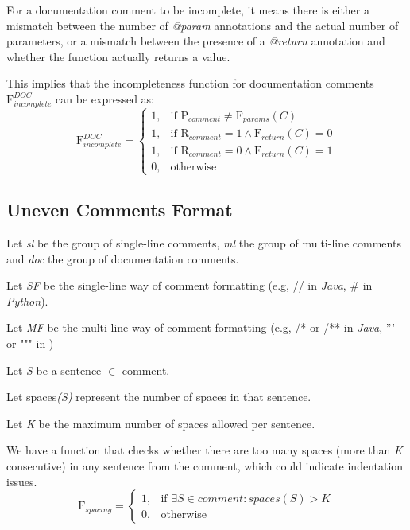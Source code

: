 \noindent For a documentation comment to be incomplete, it means there is either a mismatch between the number of \textit{@param} annotations and the actual number of parameters, or a mismatch between the presence of a \textit{@return} annotation and whether the function actually returns a value.

\noindent This implies that the incompleteness function for documentation comments $\mathrm{F}_{incomplete}^{DOC}$ can be expressed as:
\begin{equation*}
	\mathrm{F}_{incomplete}^{DOC} = \begin{cases}
		1, & \text{if } \mathrm{P}_{comment} \ne \mathrm{F}_{params}(C) \\
		1, & \text{if } \mathrm{R}_{comment} = 1 \wedge \mathrm{F}_{return}(C) = 0 \\
		1, & \text{if } \mathrm{R}_{comment} = 0 \wedge \mathrm{F}_{return}(C) = 1 \\
		0, & \text{otherwise}
	\end{cases}
\end{equation*}

\subsection{Uneven Comments Format}
Let \textit{sl} be the group of single-line comments, \textit{ml} the group of multi-line comments and \textit{doc} the group of documentation comments.

\noindent Let \textit{SF} be the single-line way of comment formatting (e.g, // in \textit{Java}, # in \textit{Python}).

\noindent Let \textit{MF} be the multi-line way of comment formatting (e.g, /* or /** in \textit{Java}, ''' or """ in )

\noindent Let \textit{S} be a sentence $\in$ comment.

\noindent Let spaces\textit{(S)} represent the number of spaces in that sentence.

\noindent Let \textit{K} be the maximum number of spaces allowed per sentence.

\noindent We have a function that checks whether there are too many spaces (more than \textit{K} consecutive) in any sentence from the comment, which could indicate indentation issues.
\begin{equation*}
	\mathrm{F}_{spacing} = \begin{cases}
		1, & \text{if } \exists S \in comment : spaces(S) > K \\
		0, & \text{otherwise}
	\end{cases}
\end{equation*}

